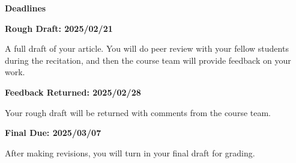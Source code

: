 \documentclass{article}
\begin{document}
    \par\hfill\par
    \textbf{\Large{Deadlines}}
    \par\hfill\par
    \textbf{Rough Draft: 2025/02/21}
    \par
    A full draft of your article. You will do peer review with your fellow
    students during the recitation, and then the course team will provide
    feedback on your work.
    \par\hfill\par
    \textbf{Feedback Returned: 2025/02/28}
    \par
    Your rough draft will be returned with comments from the course team.
    \par\hfill\par
    \textbf{Final Due: 2025/03/07}
    \par
    After making revisions, you will turn in your final draft for grading.
\end{document}
